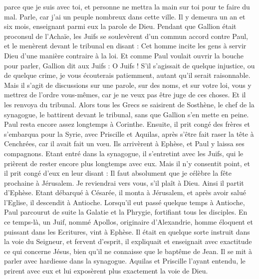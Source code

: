 \begin{multicols}{2}
parce que je suis avec toi, et personne ne mettra la main sur toi pour te faire du mal. Parle, car j'ai un peuple nombreux dans cette ville.
Il y demeura un an et six mois, enseignant parmi eux la parole de Dieu.
Pendant que Gallion était proconsul de l’Achaïe, les Juifs se soulevèrent d'un commun accord contre Paul, et le menèrent devant le tribunal
en disant : Cet homme incite les gens à servir Dieu d’une manière contraire à la loi.
Et comme Paul voulait ouvrir la bouche pour parler, Gallion dit aux Juifs : O Juifs ! S’il s’agissait de quelque injustice, ou de quelque crime, je vous écouterais patiemment, autant qu’il serait raisonnable.
Mais il s’agit de discussions sur une parole, sur des noms, et sur votre loi, vous y mettrez de l’ordre vous-mêmes, car je ne veux pas être juge de ces choses.
Et il les renvoya du tribunal.
Alors tous les Grecs se saisirent de Sosthène, le chef de la synagogue, le battirent devant le tribunal, sans que Gallion s'en mette en peine.
Paul resta encore assez longtemps à Corinthe. Ensuite, il prit congé des frères et s’embarqua pour la Syrie, avec Priscille et Aquilas, après s’être fait raser la tête à Cenchrées, car il avait fait un vœu.
Ils arrivèrent à Ephèse, et Paul y laissa ses compagnons. Etant entré dans la synagogue, il s’entretint avec les Juifs,
qui le prièrent de rester encore plus longtemps avec eux.
Mais il n’y consentit point, et il prit congé d'eux en leur disant : Il faut absolument que je célèbre la fête prochaine à Jérusalem. Je reviendrai vers vous, s'il plaît à Dieu. Ainsi il partit d'Ephèse.
Etant débarqué à Césarée, il monta à Jérusalem, et après avoir salué l'Eglise, il descendit à Antioche.
Lorsqu’il eut passé quelque temps à Antioche, Paul parcourut de suite la Galatie et la Phrygie, fortifiant tous les disciples.
En ce temps-là, un Juif, nommé Apollos, originaire d’Alexandrie, homme éloquent et puissant dans les Ecritures, vint à Ephèse.
Il était en quelque sorte instruit dans la voie du Seigneur, et fervent d’esprit, il expliquait et enseignait avec exactitude ce qui concerne Jésus, bien qu’il ne connaisse que le baptême de Jean.
Il se mit à parler avec hardiesse dans la synagogue. Aquilas et Priscille l’ayant entendu, le prirent avec eux et lui exposèrent plus exactement la voie de Dieu.

\end{multicols}
